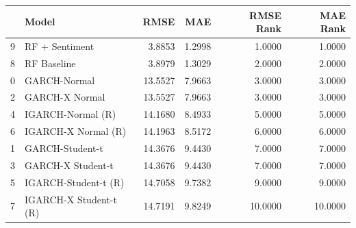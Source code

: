 \begin{table}[htbp]
\centering
\begin{tabular}{llrrrr}
\toprule
 & Model & RMSE & MAE & RMSE Rank & MAE Rank \\
\midrule
9 & RF + Sentiment & 3.8853 & 1.2998 & 1.0000 & 1.0000 \\
8 & RF Baseline & 3.8979 & 1.3029 & 2.0000 & 2.0000 \\
0 & GARCH-Normal & 13.5527 & 7.9663 & 3.0000 & 3.0000 \\
2 & GARCH-X Normal & 13.5527 & 7.9663 & 3.0000 & 3.0000 \\
4 & IGARCH-Normal (R) & 14.1680 & 8.4933 & 5.0000 & 5.0000 \\
6 & IGARCH-X Normal (R) & 14.1963 & 8.5172 & 6.0000 & 6.0000 \\
1 & GARCH-Student-t & 14.3676 & 9.4430 & 7.0000 & 7.0000 \\
3 & GARCH-X Student-t & 14.3676 & 9.4430 & 7.0000 & 7.0000 \\
5 & IGARCH-Student-t (R) & 14.7058 & 9.7382 & 9.0000 & 9.0000 \\
7 & IGARCH-X Student-t (R) & 14.7191 & 9.8249 & 10.0000 & 10.0000 \\
\bottomrule
\end{tabular}
\label{tab:robustness_rmse_mae}
\end{table}
